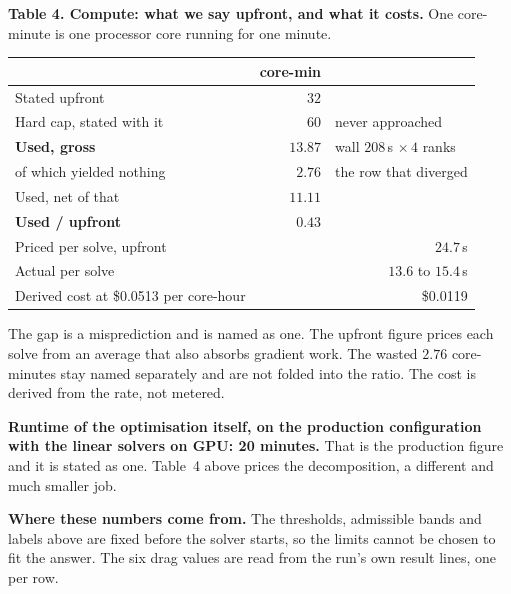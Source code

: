 \documentclass[9pt,a4paper]{article}
\renewcommand{\footnotesize}{\fontsize{6.4}{6.85}\selectfont}
\renewcommand{\scriptsize}{\fontsize{5.7}{6.1}\selectfont}
\begin{document}
\begin{minipage}[t]{0.435\textwidth}
\textbf{Table 4. Compute: what we say upfront, and what it costs.}
One core-minute is one processor core running for one minute.

\vspace{1.5pt}
{\fontsize{6.7}{7.9}\selectfont
\begin{tabular}{@{}l r >{\raggedright\arraybackslash}p{26mm}@{}}
\toprule
& core-min & \\
\midrule
Stated upfront                   & $32$    & \\
Hard cap, stated with it         & $60$    & never approached \\
\midrule
\textbf{Used, gross}             & $\mathbf{13.87}$ & wall $208$\,s $\times\,4$ ranks \\
\quad of which yielded nothing    & $2.76$  & the row that diverged \\
Used, net of that                & $11.11$ & \\
\midrule
\textbf{Used / upfront}          & $\mathbf{0.43}$ & \\
\midrule
Priced per solve, upfront        & \multicolumn{2}{r}{$24.7$\,s} \\
Actual per solve                 & \multicolumn{2}{r}{$13.6$ to $15.4$\,s} \\
Derived cost at \$0.0513 per core-hour & \multicolumn{2}{r}{\$0.0119} \\
\bottomrule
\end{tabular}}

\vspace{1.5pt}
{\scriptsize The gap is a misprediction and is named as one. The upfront figure
prices each solve from an average that also absorbs gradient work. The wasted
$2.76$ core-minutes stay named separately and are not folded into the ratio.
The cost is derived from the rate, not metered.}

\vspace{2.5pt}
{\scriptsize \textbf{Runtime of the optimisation itself, on the production
configuration with the linear solvers on GPU: 20 minutes.} That is the
production figure and it is stated as one. Table~4 above prices the
decomposition, a different and much smaller job.}

\vspace{3pt}
{\footnotesize \textbf{Where these numbers come from.} The thresholds,
admissible bands and labels above are fixed before the solver starts, so the
limits cannot be chosen to fit the answer. The six drag values are read from
the run's own result lines, one per row.}
\end{minipage}
\end{document}
